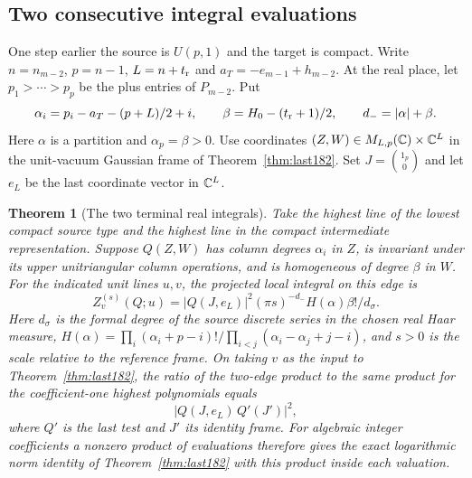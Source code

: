 \documentclass[a4paper,11pt]{article}
\newtheorem{theorem}[proposition]{Theorem}
\theoremstyle{definition}
\theoremstyle{remark}
\numberwithin{equation}{section}
\begin{document}
\subsection{Two consecutive integral evaluations}\label{nav:VIII-25}
One step earlier the source is \(U(p,1)\) and the target
is compact. Write \(n=n_{m-2}\), \(p=n-1\),
\(L=n+t_{\rm r}\) and \(a_T=-e_{m-1}+h_{m-2}\). At the
real place, let \(p_1>\cdots>p_p\) be the plus entries of
\(P_{m-2}\). Put
\[
 \alpha_i=p_i-a_T-(p+L)/2+i,\qquad
 \beta=H_0-(t_{\rm r}+1)/2,\qquad d_-=|\alpha|+\beta.
\]
Here \(\alpha\) is a partition and \(\alpha_p=\beta>0\).
Use coordinates \((Z,W)\in M_{L,p}(\mathbb C)\times\mathbb C^L\)
in the unit-vacuum Gaussian frame of
Theorem~\ref{thm:last182}. Set \(J=\binom{1_p}0\)
and let \(e_L\) be the last coordinate vector in \(\mathbb C^L\).

\begin{theorem}[The two terminal real integrals]
\label{thm:two186}
Take the highest line of the lowest compact source type and
the highest line in the compact intermediate representation.
Suppose \(Q(Z,W)\) has column degrees \(\alpha_i\) in
\(Z\), is invariant under its upper unitriangular column
operations, and is homogeneous of degree \(\beta\) in \(W\).
For the indicated unit lines \(u,v\), the projected local
integral on this edge is
\[
      Z_v^{(s)}(Q;u)= |Q(J,e_L)|^2 (\pi s)^{-d_-}
                     H(\alpha)\beta!/d_\sigma .
\]
Here \(d_\sigma\) is the formal degree of the source discrete
series in the chosen real Haar measure,
\(H(\alpha)=\prod_i(\alpha_i+p-i)!/
\prod_{i<j}(\alpha_i-\alpha_j+j-i)\), and \(s>0\) is the
scale relative to the reference frame. On taking \(v\) as
the input to Theorem~\ref{thm:last182}, the ratio of the
two-edge product to the same product for the coefficient-one
highest polynomials equals
\[
                     |Q(J,e_L)\,Q'(J')|^2 ,
\]
where \(Q'\) is the last test and \(J'\) its identity frame.
For algebraic integer coefficients a nonzero product of
evaluations therefore gives the exact logarithmic norm
identity of Theorem~\ref{thm:last182} with this product
inside each valuation.
\end{theorem}
\end{document}
